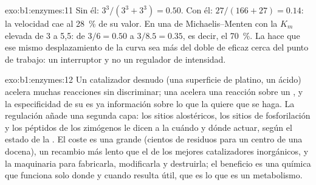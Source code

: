 \begin{solution}{exo:b1:enzymes:11}
Sin él: $3^3/(3^3 + 3^3) = 0.50$. Con él: $27/(166 + 27) = 0.14$: la
velocidad cae al \qty{28}{\%} de su valor. En una  de
Michaelis--Menten con la $K_m$ elevada de 3 a 5,5: de $3/6 = 0.50$ a
$3/8.5 = 0.35$, es decir, el \qty{70}{\%}. La  hace que ese
mismo desplazamiento de la curva sea más del doble de eficaz cerca del punto
de trabajo: un interruptor y no un regulador de intensidad.
\end{solution}

\begin{solution}{exo:b1:enzymes:12}
Un catalizador desnudo (una superficie de platino, un ácido) acelera muchas
reacciones sin discriminar; una  acelera una reacción sobre un
, y la especificidad de su  es ya información sobre lo
que la  quiere que se haga. La regulación añade una segunda capa: los
sitios alostéricos, los sitios de fosforilación y los péptidos de los
zimógenos le dicen a la  cuándo y dónde actuar, según el estado de la
. El coste es una  grande (cientos de residuos para un centro
de una docena), un recambio más lento que el de los mejores catalizadores
inorgánicos, y la maquinaria para fabricarla, modificarla y destruirla; el
beneficio es una química que funciona solo donde y cuando resulta útil, que
es lo que es un metabolismo.
\end{solution}

